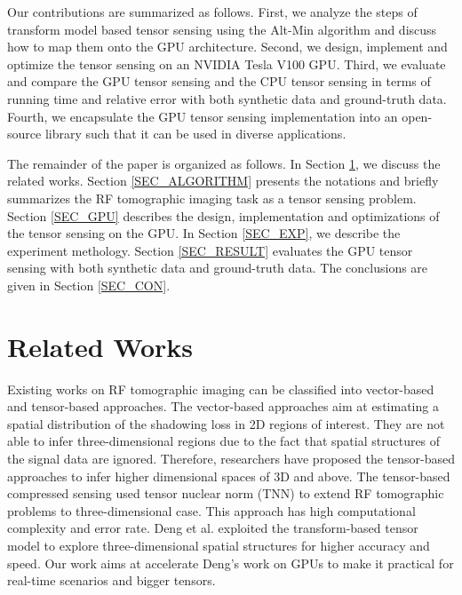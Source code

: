 \documentclass[futureinternet,article,submit,moreauthors,pdftex,10pt,a4paper]{Definitions/mdpi}
\theoremstyle{plain}
\theoremstyle{definition}
\theoremstyle{remark}
\begin{document}
Our contributions are summarized as follows. First, we analyze the steps of transform model based tensor sensing using the Alt-Min algorithm and discuss how to map them onto the GPU architecture. Second, we design, implement and optimize the tensor sensing on an NVIDIA Tesla V100 GPU. Third, we evaluate and compare the GPU tensor sensing and the CPU tensor sensing in terms of running time and relative error with both synthetic data and ground-truth data. Fourth, we encapsulate the GPU tensor sensing implementation into an open-source library such that it can be used in diverse applications.

The remainder of the paper is organized as follows. In Section \ref{SEC_RW}, we discuss the related works. Section \ref{SEC_ALGORITHM} presents the notations and briefly summarizes the RF tomographic imaging task as a tensor sensing problem. Section \ref{SEC_GPU} describes the design, implementation and optimizations of the tensor sensing on the GPU. In Section \ref{SEC_EXP}, we describe the experiment methology. Section \ref{SEC_RESULT} evaluates the GPU tensor sensing with both synthetic data and ground-truth data. The conclusions are given in Section \ref{SEC_CON}.

\section{Related Works}
\label{SEC_RW}
Existing works on RF tomographic imaging can be classified into vector-based and tensor-based approaches. The vector-based approaches \cite{kanso2009compressed} \cite{mostofi2011compressive} aim at estimating a spatial distribution of the shadowing loss in 2D regions of interest. They are not able to infer three-dimensional regions due to the fact that spatial structures of the signal data are ignored. Therefore, researchers have proposed the tensor-based approaches \cite{matsuda2017multi} \cite{deng2018tensor} to infer higher dimensional spaces of 3D and above. The tensor-based compressed sensing \cite{matsuda2017multi} used tensor nuclear norm (TNN) \cite{li2013generalized} to extend RF tomographic problems to three-dimensional case. This approach has high computational complexity and error rate. Deng et al. \cite{deng2018tensor} exploited the transform-based tensor model \cite{liu2017fourth} to explore three-dimensional spatial structures for higher accuracy and speed. Our work aims at accelerate Deng's work on GPUs to make it practical for real-time scenarios and bigger tensors.
\end{document}
